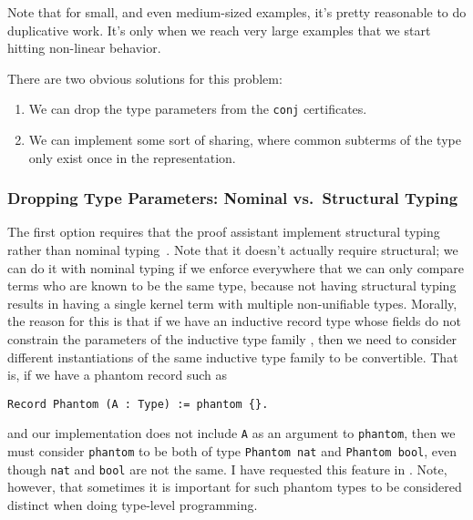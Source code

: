 Note that for small, and even medium-sized examples, it's pretty reasonable to do duplicative work.
It's only when we reach very large examples that we start hitting non-linear behavior.

There are two obvious solutions for this problem:
\begin{enumerate}
    \item
    We can drop the type parameters from the \texttt{conj} certificates.
    \item
    We can implement some sort of sharing, where common subterms of the type only exist once in the representation.
\end{enumerate}

\subsubsection{Dropping Type Parameters: Nominal vs.~Structural Typing}
The first option requires that the proof assistant implement structural typing~\cite{structural-typing} rather than nominal typing~\cite{nominal-typing}.
 Note that it doesn't actually require structural; we can do it with nominal typing if we enforce everywhere that we can only compare terms who are known to be the same type, because not having structural typing results in having a single kernel term with multiple non-unifiable types.
Morally, the reason for this is that if we have an inductive record type   whose fields do not constrain the parameters of the inductive type family , then we need to consider different instantiations of the same inductive type family to be convertible.
That is, if we have a phantom record such as
\begin{verbatim}
Record Phantom (A : Type) := phantom {}.
\end{verbatim}
and our implementation does not include \texttt{A} as an argument to \texttt{phantom}, then we must consider \texttt{phantom} to be both of type \texttt{Phantom nat} and \texttt{Phantom bool}, even though \texttt{nat} and \texttt{bool} are not the same.
I have requested this feature in \cite{https://github.com/coq/coq/issues/5293}.
Note, however, that sometimes it is important for such phantom types to be considered distinct when doing type-level programming.

